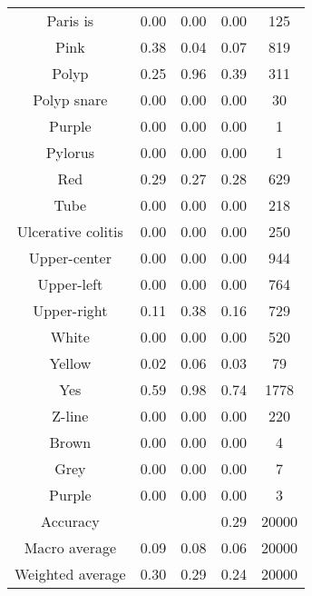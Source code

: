 \begin{center}
\begin{longtable}{|c|c|c|c|c|}
Paris is & 0.00 & 0.00 & 0.00 & 125 \\
Pink & 0.38 & 0.04 & 0.07 & 819 \\
Polyp & 0.25 & 0.96 & 0.39 & 311 \\
Polyp snare & 0.00 & 0.00 & 0.00 & 30 \\
Purple & 0.00 & 0.00 & 0.00 & 1 \\
Pylorus & 0.00 & 0.00 & 0.00 & 1 \\
Red & 0.29 & 0.27 & 0.28 & 629 \\
Tube & 0.00 & 0.00 & 0.00 & 218 \\
Ulcerative colitis & 0.00 & 0.00 & 0.00 & 250 \\
Upper-center & 0.00 & 0.00 & 0.00 & 944 \\
Upper-left & 0.00 & 0.00 & 0.00 & 764 \\
Upper-right & 0.11 & 0.38 & 0.16 & 729 \\
White & 0.00 & 0.00 & 0.00 & 520 \\
Yellow & 0.02 & 0.06 & 0.03 & 79 \\
Yes & 0.59 & 0.98 & 0.74 & 1778 \\
Z-line & 0.00 & 0.00 & 0.00 & 220 \\
Brown & 0.00 & 0.00 & 0.00 & 4 \\
Grey & 0.00 & 0.00 & 0.00 & 7 \\
Purple & 0.00 & 0.00 & 0.00 & 3 \\
\hline
Accuracy &  &  & 0.29 & 20000 \\
Macro average & 0.09 & 0.08 & 0.06 & 20000 \\
Weighted average & 0.30 & 0.29 & 0.24 & 20000 \\

\end{longtable}
\end{center}